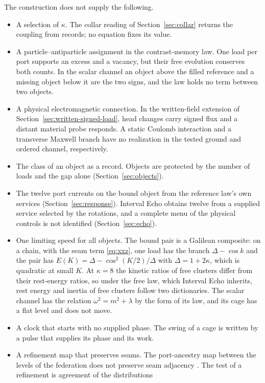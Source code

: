 \documentclass[11pt]{article}
\theoremstyle{definition}
\theoremstyle{remark}
\theoremstyle{plain}
\begin{document}
The construction does not supply the following.
\begin{itemize}[leftmargin=1.6em,itemsep=1pt]
\item A selection of $\kappa$. The collar reading of
Section~\ref{sec:collar} returns the coupling from records; no equation
fixes its value.
\item A particle--antiparticle assignment in the contrast-memory law.
One load per port supports an excess and a vacancy, but their free
evolution conserves both counts. In the scalar channel an object above the
filled reference and a missing object below it are the two signs, and the
law holds no term between two objects.
\item A physical electromagnetic connection. In the written-field
extension of Section~\ref{sec:written-signed-load}, head changes carry
signed flux and a distant material probe responds. A static Coulomb
interaction and a transverse Maxwell branch have no realization in
the tested ground and ordered channel, respectively.
\item The class of an object as a record. Objects are protected by the
number of loads and the gap alone (Section~\ref{sec:objects}).
\item The twelve port currents on the bound object from the reference
law's own services (Section~\ref{sec:response}). Interval Echo obtains
twelve from a supplied service selected by the rotations, and a complete
menu of the physical controls is not identified (Section~\ref{sec:echo}).
\item One limiting speed for all objects. The bound pair is a Galilean
composite: on a chain, with the seam term \eqref{eq:xxz}, one load has the
branch $\Delta-\cos k$ and the pair has
$E(K)=\Delta-\cos^{2}(K/2)/\Delta$ with $\Delta=1+2\kappa$, which is
quadratic at small $K$. At $\kappa=8$ the kinetic ratios of free clusters
differ from their rest-energy ratios, so under the free law, which
Interval Echo inherits, rest energy and inertia of free clusters follow two
dictionaries. The scalar channel has the relation
$\omega^2=m^2+\lambda$ by the form of its law, and its cage has a flat
level and does not move.
\item A clock that starts with no supplied phase. The swing of a cage is
written by a pulse that supplies its phase and its work.
\item A refinement map that preserves seams. The port-ancestry map between
the levels of the federation does not preserve seam adjacency
\cite{ophmicro}. The test of a refinement is agreement of the distributions

\end{itemize}
\end{document}
